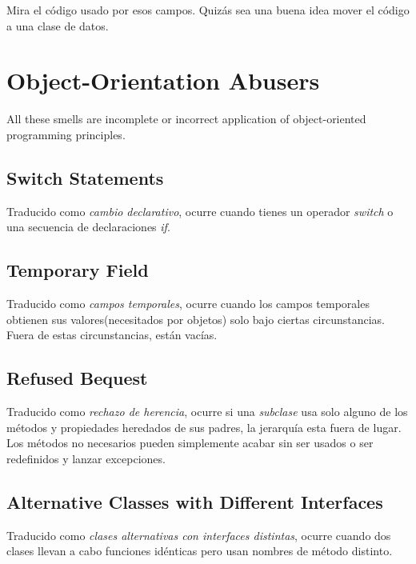\documentclass[11pt,a4paper,oneside]{book}
\begin{document}
Mira el código usado por esos campos. Quizás sea una buena idea mover el código a una clase de datos. 


    
    
    



\section{Object-Orientation Abusers} 
\label{object-orientationabusers}
All these smells are incomplete or incorrect application of object-oriented programming principles.\newline

    \subsection{Switch Statements}
    \label{switchstatements}
    Traducido como \textit{cambio declarativo}, ocurre cuando tienes un operador \textit{switch} o una secuencia de declaraciones \textit{if}.
    \newline
    
    
    \subsection{Temporary Field} 
    \label{temporaryfield}
    Traducido como \textit{campos temporales}, ocurre cuando los campos temporales obtienen sus valores(necesitados por objetos) solo bajo ciertas circunstancias. Fuera de estas circunstancias, están vacías.
    \newline
    
    \subsection{Refused Bequest}  
    \label{refusedbequest}
    Traducido como \textit{rechazo de herencia}, ocurre si una \textit{subclase} usa solo alguno de los métodos y propiedades heredados de sus padres, la jerarquía esta fuera de lugar. Los métodos no necesarios pueden simplemente acabar sin ser usados o ser redefinidos y lanzar excepciones.
    \newline
    
    \subsection{Alternative Classes with Different Interfaces}  
    \label{alternativeclasseswithdifferentinterfaces}
    Traducido como \textit{clases alternativas con interfaces distintas}, ocurre cuando dos clases llevan a cabo funciones idénticas pero usan nombres de método distinto.
    \newline
\end{document}
